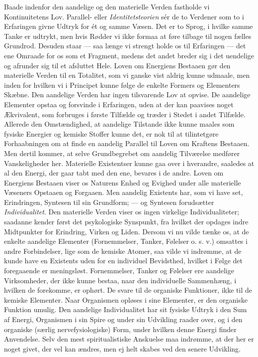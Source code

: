 \documentclass[12pt,a4paper,openany]{book}
\newcommand{\opage}[1]{\marginnote{\footnotesize\textit{[#1]}}}
\begin{document}
Baade indenfor den aandelige og den materielle Verden fastholde vi
Kontinuitetens Lov. Parallel- eller \emph{Identitetsteorien} sér de to
Verdener som to i Erfaringen givne Udtryk for ét og samme Væsen. Det er
to Sprog, i hvilke samme Tanke er udtrykt, men hvis Rødder vi ikke
formaa at føre tilbage til nogen fælles Grundrod. Desuden staar --- saa
længe vi strengt holde os til Erfaringen --- det ene Omraade for os som
et Fragment, medens det andet breder sig i det uendelige og afrunder sig
til et afsluttet Hele. Loven om Energiens Bestaaen gør den materielle
Verden til en Totalitet, som vi ganske vist aldrig kunne udmaale, men
inden for hvilken vi i Principet kunne følge de enkelte Formers og
Elementers Skæbne. Den aandelige Verden har ingen tilsvarende Lov at
opvise. De aandelige Elementer opstaa og forsvinde i Erfaringen, uden at
der kan paavises noget Ækvivalent, som forbruges i første Tilfælde og
træder i Stedet i andet Tilfælde. Allerede den Omstændighed, at
aandelige Tilstande ikke kunne maales som fysiske Energier og kemiske
Stoffer kunne det, er nok til at tilintetgøre Forhaabningen om at finde
en aandelig Parallel
\opage{79}til Loven om Kraftens Bestaaen. Men dertil kommer, at selve
Grundbegrebet om aandelig Tilværelse medfører Vanskeligheder her.
Materielle Existentser kunne gaa over i hverandre, saaledes at al den
Energi, der gaar tabt med den ene, bevares i de andre. Loven om
Energiens Bestaaen viser os Naturens Enhed og Evighed under alle
materielle Væseners Opstaaen og Forgaaen. Men aandelig Existents har,
som vi have set, Erindringen, Syntesen til sin Grundform; --- og
Syntesen forudsætter \emph{Individualitet}. Den materielle Verden viser
os ingen virkelige Individualiteter; saadanne kender først det
psykologiske Synspunkt, fra hvilket der opdages indre Midtpunkter for
Erindring, Virken og Liden. Dersom vi nu vilde tænke os, at de enkelte
aandelige Elementer (Fornemmelser, Tanker, Følelser o. s. v.) omsattes i
andre Forbindelser, lige som de kemiske Atomer, saa vilde vi indrømme,
at de kunde have en Existents uden for en individuel Bevidsthed, hvilket
i Følge det foregaaende er meningsløst. Fornemmelser, Tanker og Følelser
ere aandelige Virksomheder, der ikke kunne bestaa, naar den individuelle
Sammenhæng, i hvilken de forekomme, er ophørt. De svare til de organiske
Funktioner, ikke til de kemiske Elementer. Naar Organismen opløses i
sine Elementer, er den organiske Funktion umulig. Den aandelige
Individualitet har sit fysiske Udtryk i den Sum af Energi, Organismen i
sin Spire og under sin Udvikling raader over, og i den organiske (særlig
nervefysiologiske) Form, under hvilken denne Energi finder Anvendelse.
Selv den mest spiritualistiske Anskuelse maa indrømme, at der her er
noget givet, der vel kan ændres, men ej helt skabes ved den senere
Udvikling.
\end{document}
